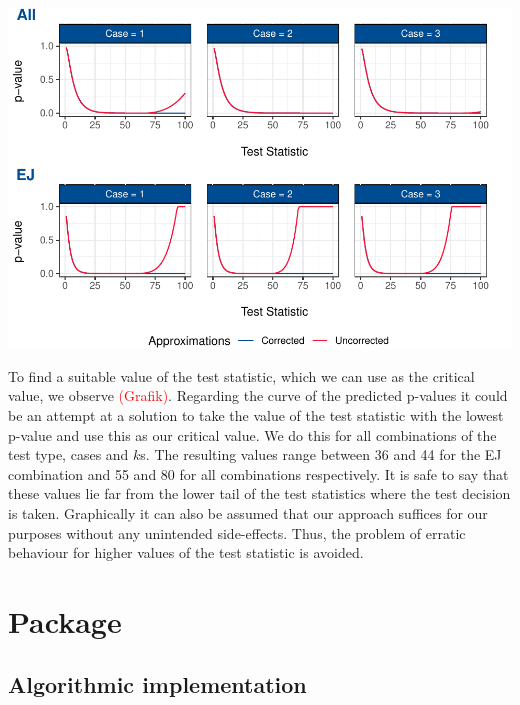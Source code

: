 \documentclass[12pt,a4paper]{article}
\let\origfigure\figure
\let\endorigfigure\endfigure
\renewenvironment{figure}[1][2] {
    \expandafter\origfigure\expandafter[H]
} {
    \endorigfigure
}
\begin{document}
\begin{figure}
\centering
\includegraphics{p_approx_paper_files/figure-latex/p_stat__k.2-1.pdf}
\caption{\label{fig:e_j_k.1} Simulted p-values plotted against p-values
approximated by final corrected models, exemplary for
\(k = 1\).Corrected (blue) and uncorrected (red) \(p\)-value predictions
for all cases and \(k = 2\), using EJ and all as underlying tests.}
\end{figure}

To find a suitable value of the test statistic, which we can use as the
critical value, we observe \textcolor{red}{(Grafik)}. Regarding the
curve of the predicted p-values it could be an attempt at a solution to
take the value of the test statistic with the lowest p-value and use
this as our critical value. We do this for all combinations of the test
type, cases and \(k\)s. The resulting values range between 36 and 44 for
the EJ combination and 55 and 80 for all combinations respectively. It
is safe to say that these values lie far from the lower tail of the test
statistics where the test decision is taken. Graphically it can also be
assumed that our approach suffices for our purposes without any
unintended side-effects. Thus, the problem of erratic behaviour for
higher values of the test statistic is avoided.

\hypertarget{package}{%
\section{Package}\label{package}}

\hypertarget{algorithmic-implementation}{%
\subsection{Algorithmic
implementation}\label{algorithmic-implementation}}
\end{document}

